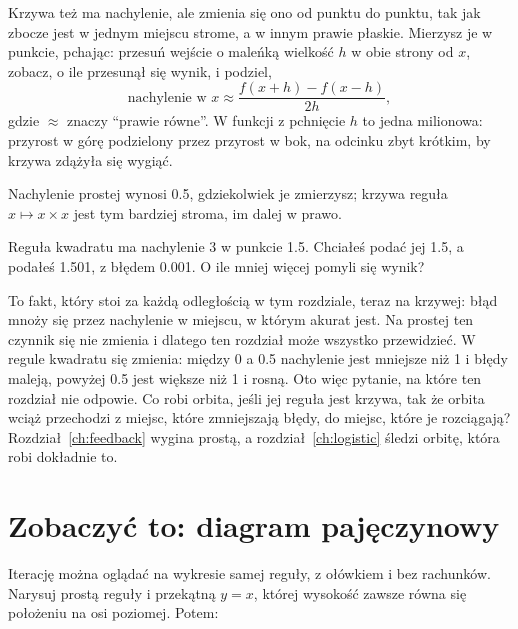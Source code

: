 Krzywa też ma nachylenie, ale zmienia się ono od punktu do punktu, tak jak
zbocze jest w jednym miejscu strome, a w innym prawie płaskie. Mierzysz je
w punkcie, pchając: przesuń wejście o maleńką wielkość $h$ w obie strony od
$x$, zobacz, o ile przesunął się wynik, i podziel,
\[ \text{nachylenie w } x \approx \frac{f(x + h) - f(x - h)}{2h} , \]
gdzie $\approx$ znaczy \enquote{prawie równe}. W funkcji  z
 pchnięcie $h$ to jedna milionowa: przyrost w górę podzielony
przez przyrost w bok, na odcinku zbyt krótkim, by krzywa zdążyła się
wygiąć.



\noindent
Nachylenie prostej wynosi \num{0.5}, gdziekolwiek je zmierzysz; krzywa
reguła $x \mapsto x \times x$ jest tym bardziej stroma, im dalej w prawo.

\begin{think}
Reguła kwadratu ma nachylenie $3$ w punkcie \num{1.5}. Chciałeś podać jej
\num{1.5}, a podałeś \num{1.501}, z błędem \num{0.001}. O ile mniej więcej
pomyli się wynik?
\end{think}
To fakt, który stoi za każdą odległością w tym rozdziale, teraz na
krzywej: błąd mnoży się przez nachylenie w miejscu, w którym akurat jest.
Na prostej ten czynnik się nie zmienia i dlatego ten rozdział może wszystko
przewidzieć. W regule kwadratu się zmienia: między $0$ a \num{0.5}
nachylenie jest mniejsze niż 1 i błędy maleją, powyżej \num{0.5} jest
większe niż 1 i rosną. Oto więc pytanie, na które ten rozdział nie odpowie.
Co robi orbita, jeśli jej reguła jest krzywa, tak że orbita wciąż
przechodzi z miejsc, które zmniejszają błędy, do miejsc, które je
rozciągają? Rozdział~\ref{ch:feedback} wygina prostą, a
rozdział~\ref{ch:logistic} śledzi orbitę, która robi dokładnie to.

\section{Zobaczyć to: diagram pajęczynowy}
\label{sec:ch02-cobweb}

\noindent
Iterację można oglądać na wykresie samej reguły, z ołówkiem i bez
rachunków. Narysuj prostą reguły i przekątną $y = x$, której wysokość
zawsze równa się położeniu na osi poziomej. Potem:

